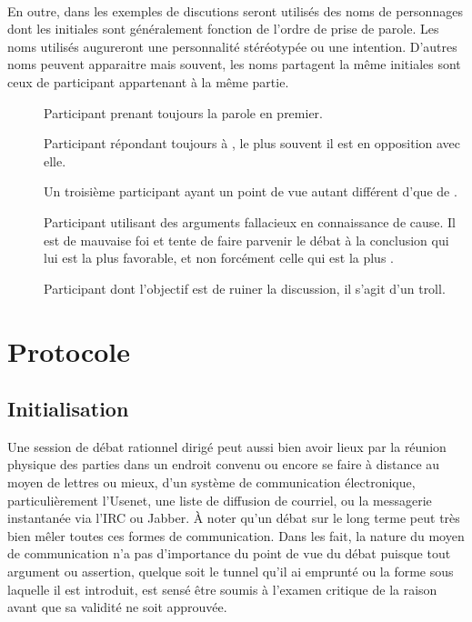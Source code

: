 \paragraph{}
En outre, dans les exemples de discutions seront utilisés des noms de personnages dont les initiales sont généralement fonction de l’ordre de prise de parole. Les noms utilisés augureront une personnalité stéréotypée ou une intention. D’autres noms peuvent apparaitre mais souvent, les noms partagent la même initiales sont ceux de participant appartenant à la même partie.

\begin{description}
  \item[\A] Participant prenant toujours la parole en premier.
  \item[\B] Participant répondant toujours à \A, le plus souvent il est en opposition avec elle.
  \item[\C] Un troisième participant ayant un point de vue autant différent d’\A que de \B.
  \item[\Sophist] Participant utilisant des arguments fallacieux en connaissance de cause. Il est de mauvaise foi et tente de faire parvenir le débat à la conclusion qui lui est la plus favorable, et non forcément celle qui est la plus .
  \item[\Troll] Participant dont l’objectif est de ruiner la discussion, il s’agit d’un troll.
\end{description}

\section{Protocole}
\subsection{Initialisation}
Une session de débat rationnel dirigé peut aussi bien avoir lieux par la réunion physique des parties dans un endroit convenu ou encore se faire à distance au moyen de lettres ou mieux, d’un système de communication électronique, particulièrement l’Usenet, une liste de diffusion de courriel, ou la messagerie instantanée via l’IRC ou Jabber. À noter qu’un débat sur le long terme peut très bien mêler toutes ces formes de communication. Dans les fait, la nature du moyen de communication n’a pas d’importance du point de vue du débat puisque tout argument ou assertion, quelque soit le tunnel qu’il ai emprunté ou la forme sous laquelle il est introduit, est sensé être soumis à l’examen critique de la raison avant que sa validité ne soit approuvée.

